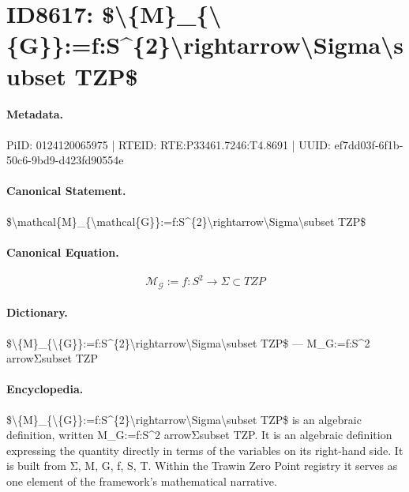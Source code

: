 \section*{ID8617: \$\textbackslash{}\{M\}\_\{\textbackslash{}\{G\}\}:=f:S\textasciicircum{}\{2\}\textbackslash{}rightarrow\textbackslash{}Sigma\textbackslash{}subset TZP\$}
\paragraph{Metadata.}
PiID: 0124120065975 | RTEID: RTE:P33461.7246:T4.8691 | UUID: ef7dd03f-6f1b-50c6-9bd9-d423fd90554e

\paragraph{Canonical Statement.}
\$\textbackslash{}mathcal\{M\}\_\{\textbackslash{}mathcal\{G\}\}:=f:S\textasciicircum{}\{2\}\textbackslash{}rightarrow\textbackslash{}Sigma\textbackslash{}subset TZP\$

\paragraph{Canonical Equation.}
\[
\mathcal{M}_{\mathcal{G}}:=f:S^{2}\rightarrow\Sigma\subset TZP
\]

\paragraph{Dictionary.}
\$\textbackslash{}\{M\}\_\{\textbackslash{}\{G\}\}:=f:S\textasciicircum{}\{2\}\textbackslash{}rightarrow\textbackslash{}Sigma\textbackslash{}subset TZP\$ — M\_G:=f:S\textasciicircum{}2 arrowΣsubset TZP

\paragraph{Encyclopedia.}
\$\textbackslash{}\{M\}\_\{\textbackslash{}\{G\}\}:=f:S\textasciicircum{}\{2\}\textbackslash{}rightarrow\textbackslash{}Sigma\textbackslash{}subset TZP\$ is an algebraic definition, written M\_G:=f:S\textasciicircum{}2 arrowΣsubset TZP. It is an algebraic definition expressing the quantity directly in terms of the variables on its right-hand side. It is built from Σ, M, G, f, S, T. Within the Trawin Zero Point registry it serves as one element of the framework's mathematical narrative.
